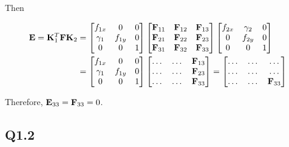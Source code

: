 \documentclass[11pt]{article}
\begin{document}
Then

\begin{align}
    \mathbf{E} = \mathbf{K}_1^T \mathbf{F} \mathbf{K}_2 &=
    \begin{bmatrix}
        f_{1x} & 0 & 0 \\
        \gamma_1 & f_{1y} & 0 \\
        0 & 0 & 1
    \end{bmatrix}
    \begin{bmatrix}
        \mathbf{F}_{11} & \mathbf{F}_{12} & \mathbf{F}_{13} \\
        \mathbf{F}_{21} & \mathbf{F}_{22} & \mathbf{F}_{23} \\
        \mathbf{F}_{31} & \mathbf{F}_{32} & \mathbf{F}_{33}
    \end{bmatrix}
    \begin{bmatrix}
        f_{2x} & \gamma_2 & 0 \\
        0 & f_{2y} & 0 \\
        0 & 0 & 1
    \end{bmatrix}
    \\
    &= \begin{bmatrix}
        f_{1x} & 0 & 0 \\
        \gamma_1 & f_{1y} & 0 \\
        0 & 0 & 1
    \end{bmatrix}
    \begin{bmatrix}
        \dots & \dots & \mathbf{F}_{13} \\
        \dots & \dots & \mathbf{F}_{23} \\
        \dots & \dots & \mathbf{F}_{33} \\
    \end{bmatrix}
    =
    \begin{bmatrix}
        \dots & \dots & \dots \\
        \dots & \dots & \dots \\
        \dots & \dots & \mathbf{F}_{33} \\
    \end{bmatrix}
\end{align}

Therefore, $\mathbf{E}_{33} = \mathbf{F}_{33}=0$.

\newpage

\subsection*{Q1.2}
\end{document}
